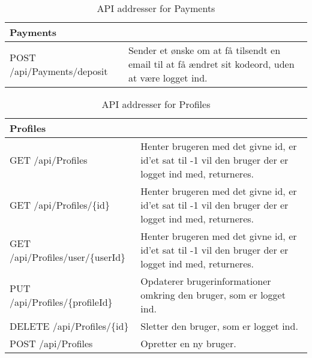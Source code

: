 \begin{table}[H]
	\centering
	\caption{API addresser for Payments}
	\label{tab:web_user}
	\begin{tabular}{p{5cm}|p{11cm}}
		\hline
		\multicolumn{2}{l}{\textbf{Payments}}\\
		\hline
		POST \newline
		/api/Payments/deposit &
		Sender et ønske om at få tilsendt en email til at få ændret sit kodeord, uden at være logget ind. 
		\\
		\hline
	\end{tabular}
\end{table}

\begin{table}[H]
	\centering
	\caption{API addresser for Profiles}
	\label{tab:web_user}
	\begin{tabular}{p{5cm}|p{11cm}}
		\hline
		\multicolumn{2}{l}{\textbf{Profiles}}\\
		\hline
		GET \newline
		/api/Profiles &
		Henter brugeren med det givne id, er id'et sat til -1 vil den bruger der er logget ind med, returneres. \\
        \hline
        GET \newline
		/api/Profiles/\{id\} &
		Henter brugeren med det givne id, er id'et sat til -1 vil den bruger der er logget ind med, returneres. \\
        \hline
        GET \newline
		/api/Profiles/user/\{userId\} &
		Henter brugeren med det givne id, er id'et sat til -1 vil den bruger der er logget ind med, returneres. \\
		\hline
		PUT \newline
		/api/Profiles/\{profileId\} &
		Opdaterer brugerinformationer omkring den bruger, som er logget ind. \\
		\hline
		DELETE \newline
		/api/Profiles/\{id\} &
		Sletter den bruger, som er logget ind. \\
		\hline
		POST \newline
		/api/Profiles &
		Opretter en ny bruger. \\
		\hline
		
	\end{tabular}
\end{table}

